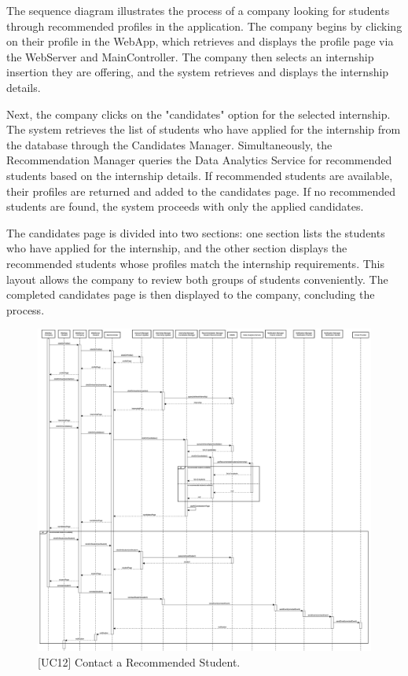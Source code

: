 The sequence diagram illustrates the process of a company looking for students through recommended profiles in the application. The company begins by clicking on their profile in the WebApp, which retrieves and displays the profile page via the WebServer and MainController. The company then selects an internship insertion they are offering, and the system retrieves and displays the internship details.

Next, the company clicks on the "candidates" option for the selected internship. The system retrieves the list of students who have applied for the internship from the database through the Candidates Manager. Simultaneously, the Recommendation Manager queries the Data Analytics Service for recommended students based on the internship details. If recommended students are available, their profiles are returned and added to the candidates page. If no recommended students are found, the system proceeds with only the applied candidates.

The candidates page is divided into two sections: one section lists the students who have applied for the internship, and the other section displays the recommended students whose profiles match the internship requirements. This layout allows the company to review both groups of students conveniently. The completed candidates page is then displayed to the company, concluding the process.

\begin{figure}[htbp]
    \centering
    \includegraphics[width=\linewidth]{DD/Images/sequenceDiagrams/ContactRecStudent.png}
    \caption{[UC12] Contact a Recommended Student.}
    \label{fig:conctactRecStudent_immagine}
\end{figure}
\clearpage


